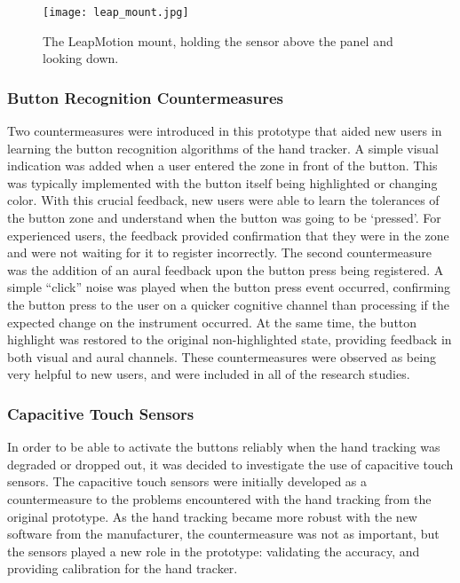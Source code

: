 \begin{figure}
    \centering
    \texttt{[image: leap\_mount.jpg]}
    \caption{The LeapMotion mount, holding the sensor above the panel and looking down.}
    \label{fig:proto_leap_mount}
\end{figure}

\subsubsection{Button Recognition Countermeasures}

Two countermeasures were introduced in this prototype that aided new users in learning the button recognition algorithms of the hand tracker.
A simple visual indication was added when a user entered the zone in front of the button.
This was typically implemented with the button itself being highlighted or changing color.
With this crucial feedback, new users were able to learn the tolerances of the button zone and understand when the button was going to be `pressed'.
For experienced users, the feedback provided confirmation that they were in the zone and were not waiting for it to register incorrectly.
The second countermeasure was the addition of an aural feedback upon the button press being registered.
A simple ``click'' noise was played when the button press event occurred, confirming the button press to the user on a quicker cognitive channel than processing if the expected change on the instrument occurred.
At the same time, the button highlight was restored to the original non-highlighted state, providing feedback in both visual and aural channels.
These countermeasures were observed as being very helpful to new users, and were included in all of the research studies.

\subsubsection{Capacitive Touch Sensors}
\label{sec:proto_cap_touch}

In order to be able to activate the buttons reliably when the hand tracking was degraded or dropped out, it was decided to investigate the use of capacitive touch sensors.
The capacitive touch sensors were initially developed as a countermeasure to the problems encountered with the hand tracking from the original prototype.
As the hand tracking became more robust with the new software from the manufacturer, the countermeasure was not as important, but the sensors played a new role in the prototype: validating the accuracy, and providing calibration for the hand tracker.

